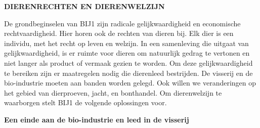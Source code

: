 \textbf{DIERENRECHTEN EN DIERENWELZIJN}

De grondbeginselen van BIJ1 zijn radicale gelijkwaardigheid en
economische rechtvaardigheid. Hier horen ook de rechten van dieren bij.
Elk dier is een individu, met het recht op leven en welzijn. In een
samenleving die uitgaat van gelijkwaardigheid, is er ruimte voor dieren
om natuurlijk gedrag te vertonen en niet langer als product of vermaak
gezien te worden. Om deze gelijkwaardigheid te bereiken zijn er
maatregelen nodig die dierenleed bestrijden. De visserij en de
bio-industrie moeten aan banden worden gelegd. Ook willen we
veranderingen op het gebied van dierproeven, jacht, en bonthandel. Om
dierenwelzijn te waarborgen stelt BIJ1 de volgende oplossingen voor.

\textbf{Een einde aan de bio-industrie en leed in de visserij}

